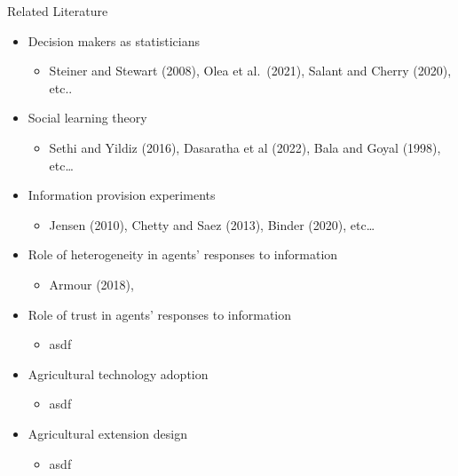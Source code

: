 \documentclass[
  ignorenonframetext,
]{beamer}
\providecommand{\tightlist}{%
  \setlength{\itemsep}{0pt}\setlength{\parskip}{0pt}}\usepackage{longtable,booktabs,array}
\begin{document}
\begin{frame}{Related Literature}
\protect\hypertarget{related-literature}{}
\begin{itemize}
\tightlist
\item
  Decision makers as statisticians

  \begin{itemize}
  \tightlist
  \item
    Steiner and Stewart (2008), Olea et al.~(2021), Salant and Cherry
    (2020), etc..
  \end{itemize}
\item
  Social learning theory

  \begin{itemize}
  \tightlist
  \item
    Sethi and Yildiz (2016), Dasaratha et al (2022), Bala and Goyal
    (1998), etc\ldots{}
  \end{itemize}
\item
  Information provision experiments

  \begin{itemize}
  \tightlist
  \item
    Jensen (2010), Chetty and Saez (2013), Binder (2020), etc\ldots{}
  \end{itemize}
\item
  Role of heterogeneity in agents' responses to information

  \begin{itemize}
  \tightlist
  \item
    Armour (2018),
  \end{itemize}
\item
  Role of trust in agents' responses to information

  \begin{itemize}
  \tightlist
  \item
    asdf
  \end{itemize}
\item
  Agricultural technology adoption

  \begin{itemize}
  \tightlist
  \item
    asdf
  \end{itemize}
\item
  Agricultural extension design

  \begin{itemize}
  \tightlist
  \item
    asdf
  \end{itemize}
\end{itemize}
\end{frame}
\end{document}
